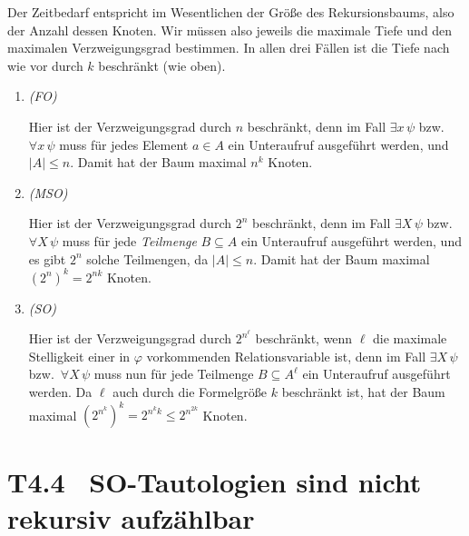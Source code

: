 \documentclass[fontsize=11pt, twoside=false, numbers=autoenddot]{scrbook}
\begin{document}
\begin{beweis}
  Der Zeitbedarf entspricht im Wesentlichen
  der Größe des Rekursionsbaums, also der Anzahl dessen Knoten.
  Wir müssen also jeweils die maximale Tiefe und den maximalen
  Verzweigungsgrad bestimmen.
  In allen drei Fällen ist die Tiefe nach wie vor durch $k$ beschränkt
  (wie oben).
  \begin{enumerate}
    \item
      \emph{(FO)}
      \par
      Hier ist der Verzweigungsgrad durch $n$ beschränkt,
      denn im Fall $\exists x\,\psi$ bzw.\ $\forall x\,\psi$
      muss für jedes Element $a \in A$ ein Unteraufruf ausgeführt werden,
      und $|A| \leq n$.
      Damit hat der Baum maximal $n^k$ Knoten.
    \item
      \emph{(MSO)}
      \par
      Hier ist der Verzweigungsgrad durch $2^n$ beschränkt,
      denn im Fall $\exists X\,\psi$ bzw.\ $\forall X\,\psi$
      muss für jede \emph{Teilmenge} $B \subseteq A$ ein Unteraufruf ausgeführt werden,
      und es gibt $2^n$ solche Teilmengen, da $|A| \leq n$.
      Damit hat der Baum maximal $(2^n)^k = 2^{nk}$ Knoten.
    \item
      \emph{(SO)}
      \par
      Hier ist der Verzweigungsgrad durch $2^{n^\ell}$ beschränkt,
      wenn $\ell$ die maximale Stelligkeit einer in $\varphi$ vorkommenden Relationsvariable ist,
      denn im Fall $\exists X\,\psi$ bzw.\ $\forall X\,\psi$
      muss nun für jede Teilmenge $B \subseteq A^\ell$ ein Unteraufruf ausgeführt werden.
      Da $\ell$ auch durch die Formelgröße $k$ beschränkt ist,
      hat der Baum maximal $(2^{n^k})^k = 2^{n^kk} \leq 2^{n^{2k}}$ Knoten.
      \qedhere
  \end{enumerate}
\end{beweis}%

\section*{T4.4~ SO-Tautologien sind nicht rekursiv aufzählbar}
\end{document}
